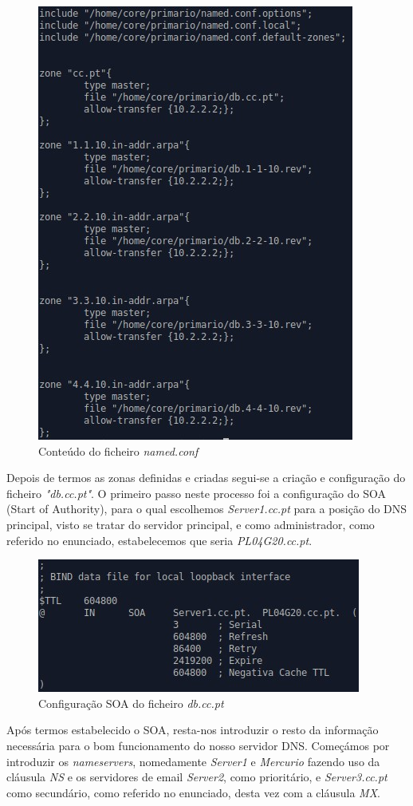 \documentclass[11pt]{article}
\begin{document}

\begin{figure}[!htb]
    \centering
    \includegraphics[width=.6\textwidth]{images/Parte2/2_a.jpg}
    \caption{Conteúdo do ficheiro \textit{named.conf}}
    \label{fig:namedconf}
\end{figure}

\par Depois de termos as zonas definidas e criadas segui-se a criação e configuração do ficheiro \textit{"db.cc.pt"}. O primeiro passo neste processo foi a configuração do SOA (Start of Authority), para o qual escolhemos \textit{Server1.cc.pt} para a posição do DNS principal, visto se tratar do servidor principal, e como administrador, como referido no enunciado, estabelecemos que seria \textit{PL04G20.cc.pt}.

\begin{figure}[H]
    \centering
    \includegraphics[width=.6\textwidth]{images/Parte2/2_SOA.jpg}
    \caption{Configuração SOA do ficheiro \textit{db.cc.pt}}
    \label{fig:soaCCPT}
\end{figure}

\par Após termos estabelecido o SOA, resta-nos introduzir o resto da informação necessária para o bom funcionamento do nosso servidor DNS. Começámos por introduzir os \textit{nameservers}, nomedamente \textit{Server1} e \textit{Mercurio} fazendo uso da cláusula \textit{NS} e os servidores de email \textit{Server2}, como prioritário, e \textit{Server3.cc.pt} como secundário, como referido no enunciado, desta vez com a cláusula \textit{MX}.
\end{document}
